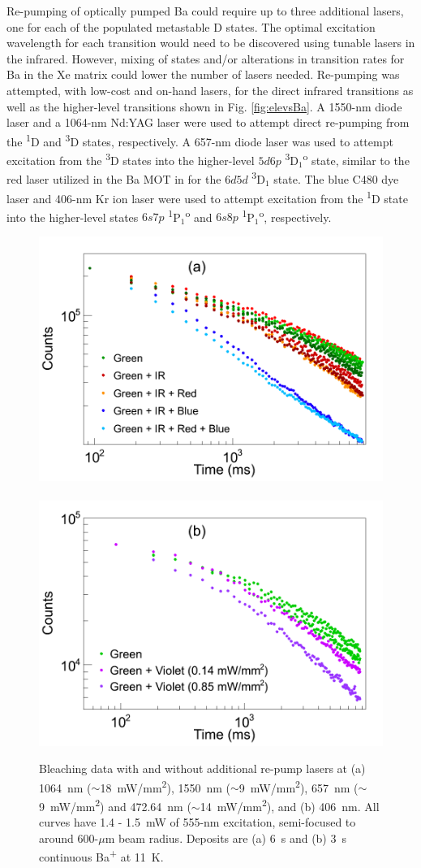 
Re-pumping of optically pumped Ba could require up to three additional lasers, one for each of the populated metastable D states.  The optimal excitation wavelength for each transition would need to be discovered using tunable lasers in the infrared.  However, mixing of states and/or alterations in transition rates for Ba in the Xe matrix could lower the number of lasers needed.  Re-pumping was attempted, with low-cost and on-hand lasers, for the direct infrared transitions as well as the higher-level transitions shown in Fig. \ref{fig:elevsBa}.  A 1550-nm diode laser and a 1064-nm Nd:YAG laser were used to attempt direct re-pumping from the \textsuperscript{1}D and \textsuperscript{3}D states, respectively.  A 657-nm diode laser was used to attempt excitation from the \textsuperscript{3}D states into the higher-level $5d6p$ \textsuperscript{3}D$_{1}$\textsuperscript{o} state, similar to the red laser utilized in the Ba MOT in \cite{BaMOT} for the $6d5d$ \textsuperscript{3}D$_{1}$ state.  The blue C480 dye laser and 406-nm Kr ion laser were used to attempt excitation from the \textsuperscript{1}D state into the higher-level states $6s7p$ \textsuperscript{1}P$_{1}$\textsuperscript{o} and $6s8p$ \textsuperscript{1}P$_{1}$\textsuperscript{o}, respectively.


\begin{figure} %
        \centering
                \includegraphics[width=.5\textwidth]{figures/bleach_re-pump_a.png}
                ~
                \includegraphics[width=.5\textwidth]{figures/bleach_re-pump_b.png}
                \caption{Bleaching data with and without additional re-pump lasers at (a) 1064~nm ($\sim$18~mW/mm\textsuperscript{2}), 1550~nm ($\sim$9~mW/mm\textsuperscript{2}), 657~nm ($\sim$9~mW/mm\textsuperscript{2}) and 472.64~nm ($\sim$14~mW/mm\textsuperscript{2}), and (b) 406~nm.  All curves have 1.4 - 1.5~mW of 555-nm excitation, semi-focused to around 600-$\mu$m beam radius.  Deposits are (a) 6~s and (b) 3~s continuous Ba\textsuperscript{+} at 11~K.}
\label{fig:bleach_repump}
\end{figure}

